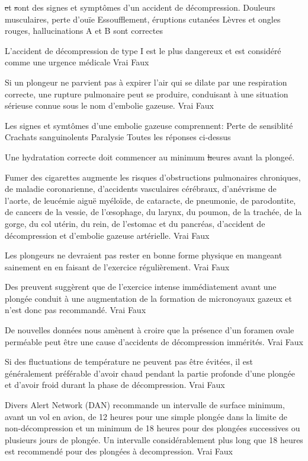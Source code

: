 \documentclass[english,10pt,a4paper,twoside]{article}
\begin{document}
\begin{outline}
		\1 \st et \st sont des signes et symptômes d'un accident de décompression.
			\2 Douleurs musculaires, perte d'ouïe
			\2 Essoufflement, éruptions cutanées
			\2 Lèvres et ongles rouges, hallucinations
			\2 A et B sont correctes

		\1 L'accident de décompression de type I est le plus dangereux et est considéré comme une urgence médicale
			\2 Vrai
			\2 Faux

		\1 Si un plongeur ne parvient pas à expirer l'air qui se dilate par une respiration correcte, une rupture pulmonaire peut se produire, conduisant à une situation sérieuse connue sous le nom d'embolie gazeuse.
			\2 Vrai
			\2 Faux

		\1 Les signes et symtômes d'une embolie gazeuse comprennent:
			\2 Perte de sensiblité
			\2 Crachats sanguinolents
			\2 Paralysie
			\2 Toutes les réponses ci-dessus

		\1 Une hydratation correcte doit commencer au minimum	\st heures avant la plongeé.

		\1 Fumer des cigarettes augmente les risques d'obstructions pulmonaires chroniques, de maladie coronarienne, d'accidents vasculaires cérébraux, d'anévrisme de l'aorte, de leucémie aiguë myéloïde, de cataracte, de pneumonie, de parodontite, de cancers de la vessie, de l'œsophage, du larynx, du poumon, de la trachée, de la gorge, du col utérin, du rein, de l'estomac et du pancréas, d'accident de décompression et d'embolie gazeuse artérielle.
			\2 Vrai
			\2 Faux

		\1 Les plongeurs ne devraient pas rester en bonne forme physique en mangeant sainement en en faisant de l'exercice régulièrement.
			\2 Vrai
			\2 Faux

		\1 Des preuvent suggèrent que de l'exercice intense immédiatement avant une plongée conduit à une augmentation de la formation de micronoyaux gazeux et n'est donc pas recommandé.
			\2 Vrai
			\2 Faux

		\1 De nouvelles données nous amènent à croire que la présence d'un foramen ovale perméable peut être une cause d'accidents de décompression immérités.
			\2 Vrai
			\2 Faux

		\1 Si des fluctuations de température ne peuvent pas être évitées, il est généralement préférable d'avoir chaud pendant la partie profonde d'une plongée et d'avoir froid durant la phase de décompression.
			\2 Vrai
			\2 Faux

		\1 Divers Alert Network (DAN) recommande un intervalle de surface minimum, avant un vol en avion, de 12 heures pour une simple plongée dans la limite de non-décompression et un minimum de 18 heures pour des plongées successives ou plusieurs jours de plongée. Un intervalle considérablement plus long que 18 heures est recommendé pour des plongées à decompression.
			\2 Vrai
			\2 Faux


\end{outline}
\end{document}
